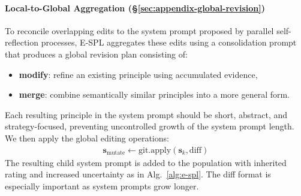 \documentclass{article}
\theoremstyle{plain}
\theoremstyle{definition}
\theoremstyle{remark}
\begin{document}
\paragraph{Local-to-Global Aggregation (\S\ref{sec:appendix-global-revision})}
To reconcile overlapping edits to the system prompt proposed by parallel self-reflection processes, E-SPL aggregates these edits using a consolidation prompt that produces a global revision plan consisting of:
\begin{itemize}
    \item \textbf{modify}: refine an existing principle using accumulated evidence,
    \item \textbf{merge}: combine semantically similar principles into a more general form.
\end{itemize}
Each resulting principle in the system prompt should be short, abstract, and strategy-focused, preventing uncontrolled growth of the system prompt length. We then apply the global editing operations:
\begin{align}
    \mathbf{s}_{\text{mutate}} \leftarrow \mathrm{git.apply}(\mathbf{s}_k, \mathrm{diff})
\end{align}
The resulting child system prompt is added to the population with inherited rating and increased uncertainty as in Alg.~\ref{alg:e-spl}. The diff format is especially important as system prompts grow longer.
\end{document}
